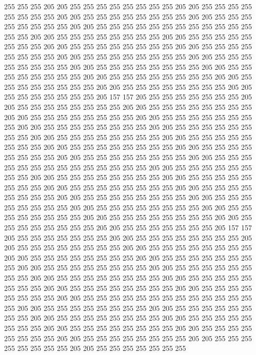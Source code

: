255 255 255 205 205 255 255 255 255 255 255 255 255 205 205 255 255 255 255 255
255 255 255 205 205 255 255 255 255 255 255 255 255 205 205 255 255 255 255 255
255 255 255 205 205 255 255 255 255 255 255 255 255 255 255 255 255 255 255 205
205 255 255 255 255 255 255 255 255 205 205 255 255 255 255 255 255 255 255 205
205 255 255 255 255 255 255 255 255 205 205 255 255 255 255 255 255 255 255 205
205 255 255 255 255 255 255 255 255 205 205 255 255 255 255 255 255 255 255 205
205 255 255 255 255 255 255 255 255 205 205 255 255 255 255 255 255 255 255 205
205 255 255 255 255 255 255 255 255 205 205 255 255 255 255 255 255 255 255 205
205 255 255 255 255 255 255 255 255 205 205 255 255 255 255 255 255 255 205 157
157 205 255 255 255 255 255 255 255 205 205 255 255 255 255 255 255 255 255 205
205 255 255 255 255 255 255 255 255 205 205 255 255 255 255 255 255 255 255 205
205 255 255 255 255 255 255 255 255 205 205 255 255 255 255 255 255 255 255 205
205 255 255 255 255 255 255 255 255 205 205 255 255 255 255 255 255 255 255 205
205 255 255 255 255 255 255 255 255 205 205 255 255 255 255 255 255 255 255 205
205 255 255 255 255 255 255 255 255 205 205 255 255 255 255 255 255 255 255 205
205 255 255 255 255 255 255 255 255 255 255 255 255 255 255 205 205 255 255 255
255 255 255 255 255 205 205 255 255 255 255 255 255 255 255 205 205 255 255 255
255 255 255 255 255 205 205 255 255 255 255 255 255 255 255 205 205 255 255 255
255 255 255 255 255 205 205 255 255 255 255 255 255 255 255 205 205 255 255 255
255 255 255 255 255 205 205 255 255 255 255 255 255 255 255 205 205 255 255 255
255 255 255 255 255 205 205 255 255 255 255 255 255 255 255 205 205 255 255 255
255 255 255 255 255 205 205 255 255 255 255 255 255 255 205 157 157 205 255 255
255 255 255 255 255 205 205 255 255 255 255 255 255 255 255 205 205 255 255 255
255 255 255 255 255 205 205 255 255 255 255 255 255 255 255 205 205 255 255 255
255 255 255 255 255 205 205 255 255 255 255 255 255 255 255 205 205 255 255 255
255 255 255 255 255 205 205 255 255 255 255 255 255 255 255 205 205 255 255 255
255 255 255 255 255 205 205 255 255 255 255 255 255 255 255 205 205 255 255 255
255 255 255 255 255 205 205 255 255 255 255 255 255 255 255 205 205 255 255 255
255 255 255 255 255 255 255 255 255 255 255 205 205 255 255 255 255 255 255 255
255 205 205 255 255 255 255 255 255 255 255 205 205 255 255 255 255 255 255 255
255 205 205 255 255 255 255 255 255 255 255 205 205 255 255 255 255 255 255 255
255 205 205 255 255 255 255 255 255 255 255 205 205 255 255 255 255 255 255 255
255 205 205 255 255 255 255 255 255 255 255 205 205 255 255 255 255 255 255 255
